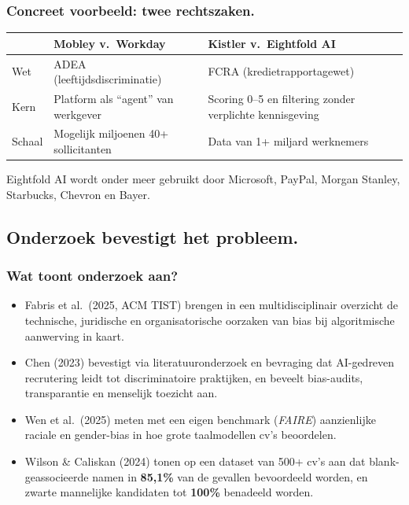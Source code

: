 \documentclass[aspectratio=169]{beamer}
\begin{document}
\begin{frame}
    \frametitle{Concreet voorbeeld: twee rechtszaken.}

    \small
    \begin{table}
        \begin{tabular}{lp{4.2cm}p{4.2cm}}
        \toprule
                        & \textbf{Mobley v.\ Workday} & \textbf{Kistler v.\ Eightfold AI} \\
        \midrule
        Wet             & ADEA (leeftijdsdiscriminatie) & FCRA (kredietrapportagewet) \\
        Kern            & Platform als ``agent'' van werkgever & Scoring 0--5 en filtering
                          zonder verplichte kennisgeving \\
        Schaal          & Mogelijk miljoenen 40+ sollicitanten & Data van 1+ miljard werknemers \\
        \bottomrule
        \end{tabular}
    \end{table}

    \medskip
    \begin{minipage}{.75\textwidth}
    Eightfold AI wordt onder meer gebruikt door Microsoft, PayPal, Morgan
    Stanley, Starbucks, Chevron en Bayer.
    \end{minipage}
\end{frame}

\subsection{Onderzoek bevestigt het probleem.}

\begin{frame}
    \frametitle{Wat toont onderzoek aan?}

    \small
    \begin{itemize}
        \item Fabris et al.\ (2025, ACM TIST) brengen in een
            multidisciplinair overzicht de technische, juridische en
            organisatorische oorzaken van bias bij algoritmische
            aanwerving in kaart.
        \item Chen (2023) bevestigt via literatuuronderzoek en bevraging
            dat AI-gedreven recrutering leidt tot discriminatoire
            praktijken, en beveelt bias-audits, transparantie en
            menselijk toezicht aan.
        \item Wen et al.\ (2025) meten met een eigen benchmark
            (\emph{FAIRE}) aanzienlijke raciale en gender-bias in hoe
            grote taalmodellen cv's beoordelen.
        \item Wilson \& Caliskan (2024) tonen op een dataset van 500+
            cv's aan dat blank-geassocieerde namen in \textbf{85,1\%}
            van de gevallen bevoordeeld worden, en zwarte mannelijke
            kandidaten tot \textbf{100\%} benadeeld worden.
    \end{itemize}
\end{frame}
\end{document}
